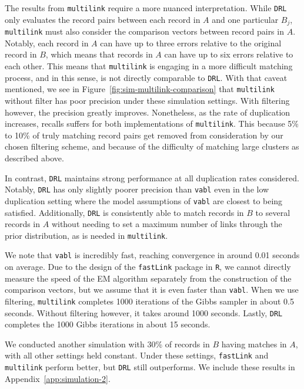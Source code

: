 \documentclass[12pt,letterpaper]{article}
\newcommand{\1}[1]{\mathbb{I}\!\left[#1\right]} %
\begin{document}
The results from \texttt{multilink} require a more nuanced interpretation. While \texttt{DRL} only evaluates the record pairs between each record in $A$ and one particular $B_j$, \texttt{multilink} must also consider the comparison vectors between record pairs in $A$. Notably, each record in $A$ can have up to three errors relative to the original record in $B$, which means that records in $A$ can have up to six errors relative to each other. This means that \texttt{multilink} is engaging in a more difficult matching process, and in this sense, is not directly comparable to \texttt{DRL}. With that caveat mentioned, we see in Figure~\ref{fig:sim-multilink-comparison} that \texttt{multilink} without filter has poor precision under these simulation settings. With filtering however, the precision greatly improves. Nonetheless, as the rate of duplication increases, recalls suffers for both implementations of \texttt{multilink}. This because 5\% to 10\% of truly matching record pairs get removed from consideration by our chosen filtering scheme, and because of the difficulty of matching large clusters as described above.

In contrast, \texttt{DRL} maintains strong performance at all duplication rates considered. Notably, \texttt{DRL} has only slightly poorer precision than \texttt{vabl} even in the low duplication setting where the model assumptions of \texttt{vabl} are closest to being satisfied. Additionally, \texttt{DRL} is consistently able to match records in $B$ to several records in $A$ without needing to set a maximum number of links through the prior distribution, as is needed in \texttt{multilink}. 

We note that \texttt{vabl} is incredibly fast, reaching convergence in around 0.01 seconds on average. Due to the design of the \texttt{fastLink} package in \texttt{R}, we cannot directly measure the speed of the EM algorithm separately from the construction of the comparison vectors, but we assume that it is even faster than \texttt{vabl}. When we use filtering, \texttt{multilink} completes 1000 iterations of the Gibbs sampler in about 0.5 seconds. Without filtering however, it takes around 1000 seconds. Lastly, \texttt{DRL} completes the 1000 Gibbs iterations in about 15 seconds. 

We conducted another simulation with 30\% of records in $B$ having matches in $A$, with all other settings held constant. Under these settings, \texttt{fastLink} and \texttt{multilink} perform better, but \texttt{DRL} still outperforms. We include these results in Appendix~\ref{app:simulation-2}.
\end{document}
